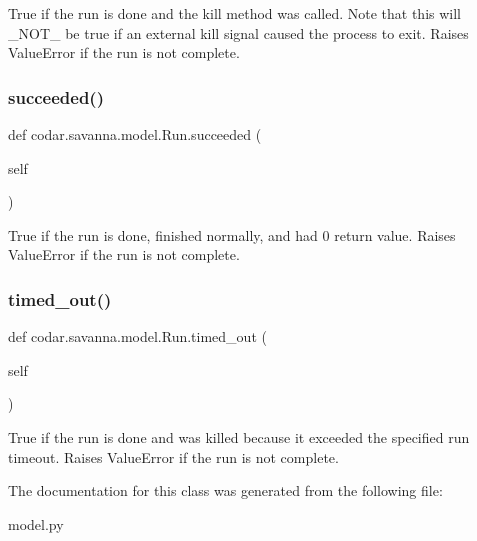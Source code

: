 \begin{DoxyVerb}True if the run is done and the kill method was called. Note that
this will _NOT_ be true if an external kill signal caused the process
to exit. Raises ValueError if the run is not complete.\end{DoxyVerb}
 \mbox{\label{classcodar_1_1savanna_1_1model_1_1_run_a5b08f9604e4010ab32059e3291448cda}} 
\subsubsection{\texorpdfstring{succeeded()}{succeeded()}}
{\footnotesize\ttfamily def codar.\+savanna.\+model.\+Run.\+succeeded (\begin{DoxyParamCaption}\item[{}]{self }\end{DoxyParamCaption})}

\begin{DoxyVerb}True if the run is done, finished normally, and had 0 return value.
Raises ValueError if the run is not complete.\end{DoxyVerb}
 \mbox{\label{classcodar_1_1savanna_1_1model_1_1_run_a3d5293dbe910c5e940e71ceeeb82778d}} 
\subsubsection{\texorpdfstring{timed\+\_\+out()}{timed\_out()}}
{\footnotesize\ttfamily def codar.\+savanna.\+model.\+Run.\+timed\+\_\+out (\begin{DoxyParamCaption}\item[{}]{self }\end{DoxyParamCaption})}

\begin{DoxyVerb}True if the run is done and was killed because it exceeded the
specified run timeout. Raises ValueError if the run is not complete.\end{DoxyVerb}
 

The documentation for this class was generated from the following file\+:\begin{DoxyCompactItemize}
\item 
model.\+py\end{DoxyCompactItemize}

